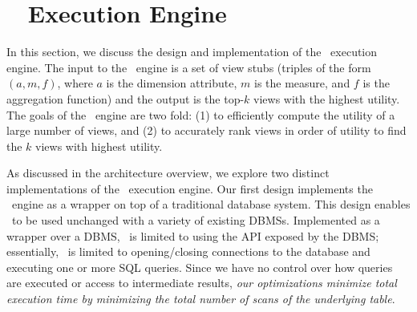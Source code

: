 
\section{{\large \SeeDB\ } Execution Engine}\label{sec:dbms-exec-engine}
In this section, we discuss the design and implementation of the \SeeDB\
execution engine. 
The input to the \SeeDB\ engine is a set of view stubs (triples of the form
$(a, m, f)$, where $a$ is the dimension attribute, $m$ is the measure,
and $f$ is the aggregation function) and the output is the top-$k$ views with the highest utility.
The goals of the \SeeDB\ engine are two fold:
(1) to efficiently compute the utility of a large number of views, and 
(2) to accurately rank views in order of
utility to find the $k$ views with highest utility.


As discussed in the architecture overview, we explore two distinct
implementations of the \SeeDB\ execution engine.
Our first design implements the \SeeDB\ engine as a wrapper on top of a
traditional database system.
This design enables \SeeDB\ to be used unchanged with a variety of
existing DBMSs.
Implemented as a wrapper over a DBMS, \SeeDB\ is limited to using the API
exposed by the DBMS; essentially, 
\SeeDB\ is limited to opening/closing connections to the
database and executing one or more SQL queries. 
Since we have no control over how queries are executed or access to intermediate
results, {\it our optimizations minimize total execution time by minimizing the
total number of scans of the underlying table}.

